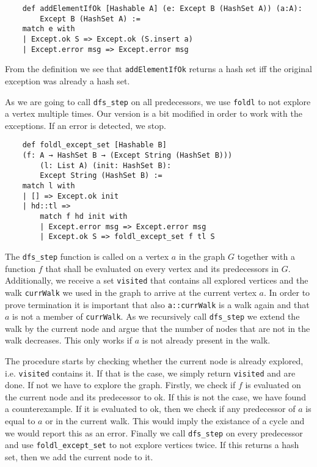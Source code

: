 \begin{lstlisting}
    def addElementIfOk [Hashable A] (e: Except B (HashSet A)) (a:A):
        Except B (HashSet A) :=
    match e with
    | Except.ok S => Except.ok (S.insert a)
    | Except.error msg => Except.error msg
\end{lstlisting}

From the definition we see that \texttt{addElementIfOk} returns a hash set iff the original exception was already a hash set.

As we are going to call \texttt{dfs\_step} on all predecessors, we use \texttt{foldl} to not explore a vertex multiple times. Our version is a bit modified in order to work with the exceptions. If an error is detected, we stop.

\begin{lstlisting}
    def foldl_except_set [Hashable B] 
    (f: A → HashSet B → (Except String (HashSet B)))
        (l: List A) (init: HashSet B):
        Except String (HashSet B) :=
    match l with
    | [] => Except.ok init
    | hd::tl =>
        match f hd init with
        | Except.error msg => Except.error msg
        | Except.ok S => foldl_except_set f tl S

\end{lstlisting}

The \texttt{dfs\_step} function is called on a vertex $a$ in the graph $G$ together with a function $f$ that shall be evaluated on every vertex and its predecessors in $G$. Additionally, we receive a set \texttt{visited} that contains all explored vertices and the walk \texttt{currWalk} we used in the graph to arrive at the current vertex $a$. In order to prove termination it is important that also \texttt{a::currWalk} is a walk again and that $a$ is not a member of \texttt{currWalk}. As we recursively call \texttt{dfs\_step} we extend the walk by the current node and argue that the number of nodes that are not in the walk decreases. This only works if $a$ is not already present in the walk.

The procedure starts by checking whether the current node is already explored, i.e. \texttt{visited} contains it. If that is the case, we simply return \texttt{visited} and are done. If not we have to explore the graph. Firstly, we check if $f$ is evaluated on the current node and its predecessor to ok. If this is not the case, we have found a counterexample. If it is evaluated to ok, then we check if any predecessor of $a$ is equal to $a$ or in the current walk. This would imply the existance of a cycle and we would report this as an error. 
Finally we call \texttt{dfs\_step} on every predecessor and use \texttt{foldl\_except\_set} to not explore vertices twice. If this returns a hash set, then we add the current node to it. 



